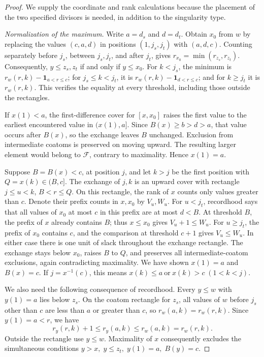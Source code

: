 \begin{proof}
We supply the coordinate and rank calculations because the placement
of the two specified divisors is needed, in addition to the singularity
type.

\smallskip\noindent\emph{Normalization of the maximum.}
Write $a=d_s$ and $d=d_t$. Obtain $x_0$ from $w$ by replacing the values
$(c,a,d)$ in positions $(1,j_s,j_t)$ with $(a,d,c)$. Counting separately
before $j_s$, between $j_s,j_t$, and after $j_t$, gives
$r_{x_0}=\min(r_{z_s},r_{z_t})$. Consequently,
$y\leq z_s,z_t$ if and only if $y\leq x_0$.
For $k<j_s$, the minimum is $r_w(r,k)-\mathbf1_{a<r\leq c}$;
for $j_s\leq k<j_t$, it is $r_w(r,k)-\mathbf1_{d<r\leq c}$;
and for $k\geq j_t$ it is $r_w(r,k)$. This verifies the equality
at every threshold, including those outside the rectangles.

If $x(1)<a$, the first-difference cover for $[x,x_0]$ raises the
first value to the earliest encountered value in $(x(1),a]$.
Since $B(x)\geq b>d>a$, that value occurs after $B(x)$, so the exchange
leaves $B$ unchanged. Exclusion from intermediate coatoms is preserved
on moving upward. The resulting larger element would belong to
$\mathcal F$, contrary to maximality. Hence $x(1)=a$.

Suppose $B=B(x)<c$, at position $j$, and let $k>j$ be the first
position with $Q=x(k)\in(B,c]$. The exchange of $j,k$ is an upward
cover with rectangle $j\leq u<k$, $B<r\leq Q$. On this rectangle,
the rank of $x$ counts only values greater than $c$. Denote their
prefix counts in $x,x_0$ by $V_u,W_u$. For $u<j_t$, recordhood says
that all values of $x_0$ at most $c$ in this prefix are at most
$d<B$. At threshold $B$, the prefix of $x$ already contains $B$;
thus $x\leq x_0$ gives $V_u+1\leq W_u$. For $u\geq j_t$, the
prefix of $x_0$ contains $c$, and the comparison at threshold $c+1$
gives $V_u\leq W_u$. In either case there is one unit of slack
throughout the exchange rectangle. The exchange stays below $x_0$,
raises $B$ to $Q$, and preserves all intermediate-coatom exclusions,
again contradicting maximality. We have shown $x(1)=a$ and $B(x)=c$.
If $j=x^{-1}(c)$, this means
$x(k)\leq a\ \text{or}\ x(k)>c\;(1<k<j)$.

We also need the following consequence of recordhood. Every $y\leq w$
with $y(1)=a$ lies below $z_s$. On the coatom rectangle for $z_s$,
all values of $w$ before $j_s$ other than $c$ are less than $a$ or
greater than $c$, so $r_w(a,k)=r_w(r,k)$. Since $y(1)=a<r$,
we have
\[
 r_y(r,k)+1\leq r_y(a,k)\leq r_w(a,k)=r_w(r,k).
\]
Outside the rectangle use $y\leq w$. Maximality of $x$ consequently
excludes the simultaneous conditions
$y>x,\; y\leq z_t,\; y(1)=a,\; B(y)=c$.


\end{proof}
